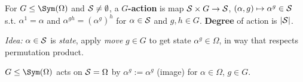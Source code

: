 \begin{slide}
    \begin{definition}
        \vspace{0pt}
        For $G \leq \Sym (\Omega)$ and $\mathcal{S} \neq \emptyset$, a \textbf{$G$-action} is map $\mathcal{S} \times G \to \mathcal{S}$, $(\alpha,g) \mapsto \alpha^g \in \mathcal{S}$ s.t. $\alpha^1 = \alpha$ and $\alpha^{gh} = (\alpha^g)^h$ for $\alpha \in \mathcal{S}$ and $g,h \in G$. \textbf{Degree} of action is $|\mathcal{S}|$.
    \end{definition}

    \textit{Idea:} $\alpha \in \mathcal{S}$ is \textit{state}, apply \textit{move} $g \in G$ to get state $\alpha^g \in \Omega$, in way that respects permutation product. \pause

    \begin{example}
        \vspace{0pt}
        $G \leq \Sym(\Omega)$ acts on $\mathcal{S} = \Omega$ by $\alpha^g := \alpha^g$ (image) for $\alpha \in \Omega$, $g \in G$.
    \end{example}

\end{slide}

